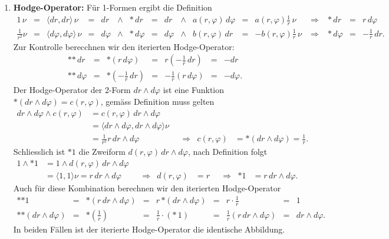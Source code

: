 \begin{enumerate}
\[\begin{matrix}
\langle d\varphi, dr \rangle & \langle d\varphi,d\varphi\rangle
\end{matrix}
\right|
=
\left|
\begin{matrix}
1&0\\
0&\frac{1}{r^2}
\end{matrix}
\right|
=
\frac{1}{r^2}.
\]
der Skalarprodukte
\item{\bf Hodge-Operator:}
Für 1-Formen ergibt die Definition
\[
\renewcommand{\arraycolsep}{1.5pt}
\begin{array}{rcrcrclcrclclcrcl}
1\,\nu
&=&
\langle dr,dr\rangle\,\nu
&=&
dr &\wedge& {\ast\,dr}
&=&
dr &\wedge& a(r,\varphi)\,d\varphi
&=&
a(r,\varphi)
\frac1r
\, \nu
&\;\Rightarrow\;&
\ast\,dr
&=&
r\,d\varphi
\\
\frac{1}{r^2}\nu
&=&
\langle d\varphi,d\varphi\rangle\,\nu
&=&
d\varphi &\wedge& {\ast\,d\varphi}
&=&
d\varphi &\wedge& b(r,\varphi)\,dr
&=&
-b(r,\varphi)\frac{1}{r}\,\nu
&\;\Rightarrow\;&
\ast\,d\varphi
&=&
-\frac1r\, dr.
\end{array}
\]
Zur Kontrolle berecchnen wir den iterierten Hodge-Operator:
\[
\renewcommand{\arraycolsep}{1.5pt}
\begin{array}{rclclcl}
\ast{\ast\,dr}
&=&
\ast(r\,d\varphi)
&=&
r(-\frac1r\,dr)
&=&
-dr
\\
\ast{\ast\,d\varphi}
&=&
\ast(-\frac1{r}\,dr)
&=&
-\frac1r(r\, d\varphi)
&=&
-d\varphi.
\end{array}
\]
Der Hodge-Operator der 2-Form $dr\wedge d\varphi$ ist eine Funktion
$\ast(dr\wedge d\varphi)=c(r,\varphi)$, gemäss Definition muss gelten
\begin{align*}
dr\wedge d\varphi\wedge c(r,\varphi)
&=
c(r,\varphi)\,dr\wedge d\varphi
\\
&=
\langle dr\wedge d\varphi,dr\wedge d\varphi\rangle \nu
\\
&=
\frac{1}{r^2} r\,dr\wedge d\varphi
&&\Rightarrow&
c(r,\varphi)
&=
\ast(dr\wedge d\varphi)
=
\frac1r.
\end{align*}
Schliesslich ist $\ast 1$ die Zweiform $d(r,\varphi)\,dr\wedge d\varphi$,
nach Definition folgt
\begin{align*}
1\wedge{\ast 1}
&=
1\wedge d(r,\varphi)\,dr\wedge d\varphi
\\
&=
\langle 1,1\rangle \nu
=
r\,dr\wedge d\varphi
&&\Rightarrow&
d(r,\varphi)
&=
r
&&\Rightarrow&
\ast 1
&=
r\,dr\wedge d\varphi.
\end{align*}
Auch für diese Kombination berechnen wir den iterierten Hodge-Operator
\[
\renewcommand{\arraycolsep}{1.5pt}
\begin{array}{rclclclcl}
\ast{\ast 1}
&=&
\ast (r\,dr\wedge d\varphi)
&=&
r\,{\ast(dr\wedge d\varphi)}
&=&
r\cdot\frac1r
&=&
1
\\
\ast{\ast(dr\wedge d\varphi)}
&=&
\ast(\frac1r)
&=&
\frac1r\cdot({\ast\, 1})
&=&
\frac1r(r\,dr\wedge d\varphi)
&=&
dr\wedge d\varphi.
\end{array}
\]
In beiden Fällen ist der iterierte Hodge-Operator die identische
Abbildung.
\end{enumerate}

